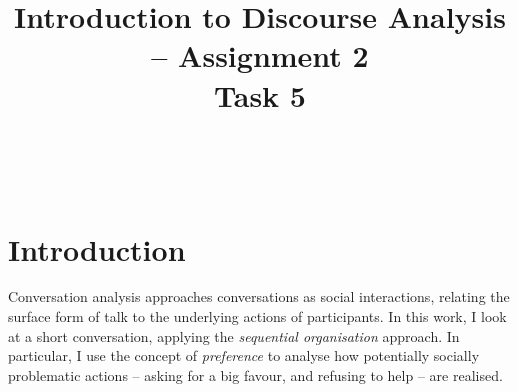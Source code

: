 \documentclass[11pt]{article}
\title{\LARGE Introduction to Discourse Analysis -- Assignment 2 \\ Task 5}
\date{}
\author{}
\begin{document}
\maketitle

\,
\vspace{-5em}






\section*{Introduction}{
	Conversation analysis 
	approaches conversations as social interactions, relating the surface form of talk to the underlying actions of participants.
	In this work, I look at a short conversation, applying the \textit{sequential organisation} approach. In particular, I use the concept of \textit{preference} to analyse how potentially socially problematic actions -- asking for a big favour, and refusing to help -- are realised.
}
\end{document}

